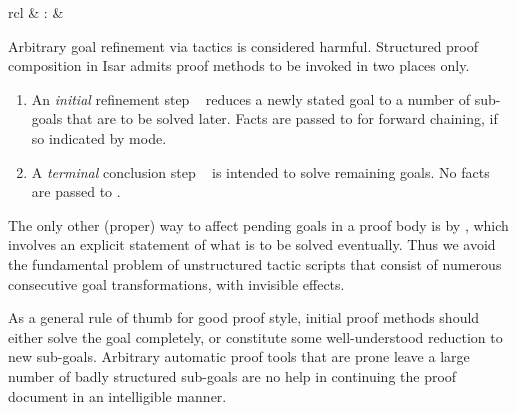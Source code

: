 \begin{isabellebody}
\begin{isamarkuptext}
\begin{matharray}{rcl}
    \hypertarget{command.sorry}{\hyperlink{command.sorry}{\mbox{}}} & : &  \\
  \end{matharray}

  Arbitrary goal refinement via tactics is considered harmful.
  Structured proof composition in Isar admits proof methods to be
  invoked in two places only.

  \begin{enumerate}

  \item An \emph{initial} refinement step \hyperlink{command.proof}{\mbox{}}~ reduces a newly stated goal to a number
  of sub-goals that are to be solved later.  Facts are passed to
   for forward chaining, if so indicated by  mode.
  
  \item A \emph{terminal} conclusion step \hyperlink{command.qed}{\mbox{}}~ is intended to solve remaining goals.  No facts are
  passed to .

  \end{enumerate}

  The only other (proper) way to affect pending goals in a proof body
  is by \hyperlink{command.show}{\mbox{}}, which involves an explicit statement of
  what is to be solved eventually.  Thus we avoid the fundamental
  problem of unstructured tactic scripts that consist of numerous
  consecutive goal transformations, with invisible effects.

  \medskip As a general rule of thumb for good proof style, initial
  proof methods should either solve the goal completely, or constitute
  some well-understood reduction to new sub-goals.  Arbitrary
  automatic proof tools that are prone leave a large number of badly
  structured sub-goals are no help in continuing the proof document in
  an intelligible manner.


\end{isamarkuptext}
\end{isabellebody}
